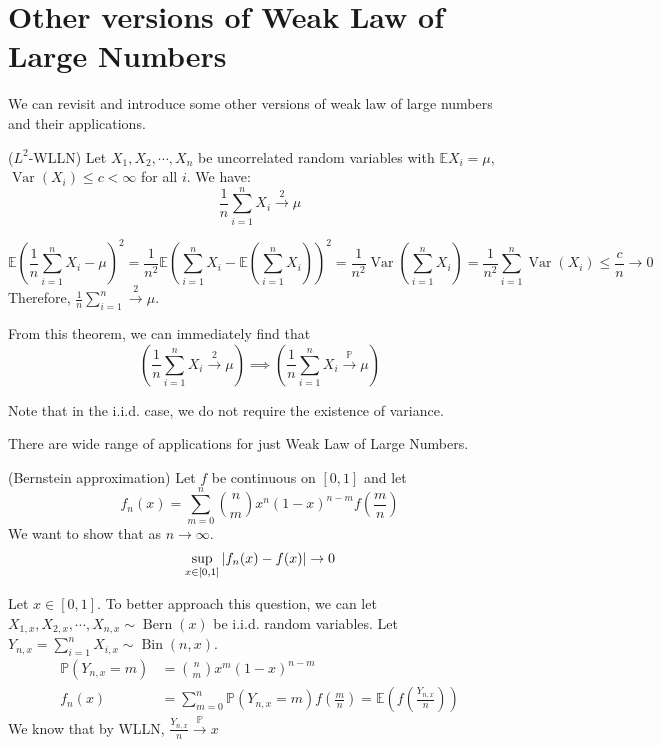 \documentclass{huhtakm-template-book}
\newcommand{\prob}{\mathbb{P}}
\newcommand{\expect}{\mathbb{E}}
\DeclareMathOperator{\Bern}{Bern}
\DeclareMathOperator{\Bin}{Bin}
\DeclareMathOperator{\Var}{Var}
\begin{document}
\section{Other versions of Weak Law of Large Numbers}
We can revisit and introduce some other versions of weak law of large numbers and their applications.
\begin{thm}($L^{2}$-WLLN) 
	Let $X_{1},X_{2},\cdots,X_{n}$ be uncorrelated random variables with $\expect X_{i}=\mu$, $\Var(X_{i})\leq c<\infty$ for all $i$. We have:
	\begin{equation*}
		\frac{1}{n}\sum_{i=1}^{n}X_{i}\xrightarrow{2}\mu
	\end{equation*}
\end{thm}
\begin{proofing}
	\begin{equation*}
		\expect\left(\frac{1}{n}\sum_{i=1}^{n}X_{i}-\mu\right)^{2}=\frac{1}{n^{2}}\expect\left(\sum_{i=1}^{n}X_{i}-\expect \left(\sum_{i=1}^{n}X_{i}\right)\right)^{2}=\frac{1}{n^{2}}\Var\left(\sum_{i=1}^{n}X_{i}\right)=\frac{1}{n^{2}}\sum_{i=1}^{n}\Var(X_{i})\leq\frac{c}{n}\to 0
	\end{equation*}
	Therefore, $\frac{1}{n}\sum_{i=1}^{n}\xrightarrow{2}\mu$.
\end{proofing}
\begin{rem}
	From this theorem, we can immediately find that
	\begin{equation*}
		\left(\frac{1}{n}\sum_{i=1}^{n}X_{i}\xrightarrow{2}\mu\right)\implies\left(\frac{1}{n}\sum_{i=1}^{n}X_{i}\xrightarrow{\prob}\mu\right)
	\end{equation*}
\end{rem}
\begin{rem}
	Note that in the i.i.d. case, we do not require the existence of variance.
\end{rem}
There are wide range of applications for just Weak Law of Large Numbers.
\begin{eg}(Bernstein approximation)
	Let $f$ be continuous on $[0,1]$ and let
	\begin{equation*}
		\tag{Bernstein polynomial}
		f_{n}(x)=\sum_{m=0}^{n}\binom{n}{m}x^{n}(1-x)^{n-m}f\left(\frac{m}{n}\right)
	\end{equation*}
	We want to show that as $n\to\infty$.
	\begin{equation*}
		\sup_{x\in[0,1]}\left|{f_{n}(x)-f(x)}\right|\to 0
	\end{equation*}
\end{eg}
\begin{rem}
	Let $x\in[0,1]$. To better approach this question, we can let $X_{1,x},X_{2,x},\cdots,X_{n,x}\sim\Bern(x)$ be i.i.d. random variables. Let $Y_{n,x}=\sum_{i=1}^{n}X_{i,x}\sim\Bin(n,x)$.
	\begin{align*}
		\prob(Y_{n,x}=m)&=\binom{n}{m}x^{m}(1-x)^{n-m}\\
		f_{n}(x)&=\sum_{m=0}^{n}\prob(Y_{n,x}=m)f\left(\frac{m}{n}\right)=\expect\left(f\left(\frac{Y_{n,x}}{n}\right)\right)
	\end{align*}
	We know that by WLLN, $\frac{Y_{n,x}}{n}\xrightarrow{\prob}x$
\end{rem}
\end{document}
